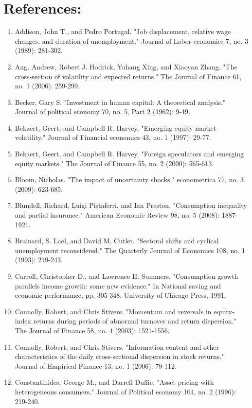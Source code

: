 \documentclass[12pt]{article}
\begin{document}
\section{References:}
\begin{enumerate}

    \item{Addison, John T., and Pedro Portugal. "Job displacement, relative wage changes, and duration of unemployment." Journal of Labor economics 7, no. 3 (1989): 281-302.}
    \item{Ang, Andrew, Robert J. Hodrick, Yuhang Xing, and Xiaoyan Zhang. "The cross‐section of volatility and expected returns." The Journal of Finance 61, no. 1 (2006): 259-299.}
    \item{Becker, Gary S. "Investment in human capital: A theoretical analysis." Journal of political economy 70, no. 5, Part 2 (1962): 9-49.}
    \item{Bekaert, Geert, and Campbell R. Harvey. "Emerging equity market volatility." Journal of Financial economics 43, no. 1 (1997): 29-77.}
    \item{Bekaert, Geert, and Campbell R. Harvey. "Foreign speculators and emerging equity markets." The Journal of Finance 55, no. 2 (2000): 565-613.}
    \item{Bloom, Nicholas. "The impact of uncertainty shocks." econometrica 77, no. 3 (2009): 623-685.}
    \item{Blundell, Richard, Luigi Pistaferri, and Ian Preston. "Consumption inequality and partial insurance." American Economic Review 98, no. 5 (2008): 1887-1921.}
    \item{Brainard, S. Lael, and David M. Cutler. "Sectoral shifts and cyclical unemployment reconsidered." The Quarterly Journal of Economics 108, no. 1 (1993): 219-243.}
    \item{Carroll, Christopher D., and Lawrence H. Summers. "Consumption growth parallels income growth: some new evidence." In National saving and economic performance, pp. 305-348. University of Chicago Press, 1991.}
    \item{Connolly, Robert, and Chris Stivers. "Momentum and reversals in equity‐index returns during periods of abnormal turnover and return dispersion." The Journal of Finance 58, no. 4 (2003): 1521-1556.}
    \item{Connolly, Robert, and Chris Stivers. "Information content and other characteristics of the daily cross-sectional dispersion in stock returns." Journal of Empirical Finance 13, no. 1 (2006): 79-112.}
    \item{Constantinides, George M., and Darrell Duffie. "Asset pricing with heterogeneous consumers." Journal of Political economy 104, no. 2 (1996): 219-240.}

\end{enumerate}
\end{document}
